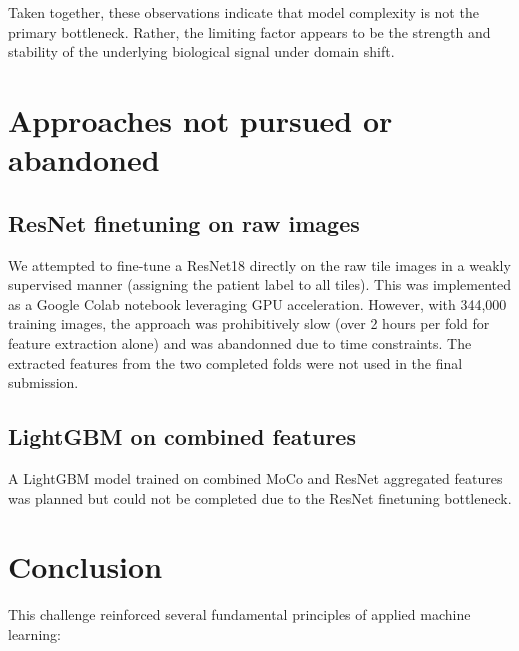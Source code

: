 \documentclass[11pt,a4paper]{article}
\begin{document}
Taken together, these observations indicate that model complexity is not the primary bottleneck. 
Rather, the limiting factor appears to be the strength and stability of the underlying biological signal under domain shift.

\newpage
\section{Approaches not pursued or abandoned}
\label{sec:abandoned}

\subsection{ResNet finetuning on raw images}
We attempted to fine-tune a ResNet18 directly on the raw tile images in a weakly supervised manner (assigning the patient label to all tiles). This was implemented as a Google Colab notebook leveraging GPU acceleration. However, with 344,000 training images, the approach was prohibitively slow (over 2 hours per fold for feature extraction alone) and was abandonned due to time constraints. The extracted features from the two completed folds were not used in the final submission.

\subsection{LightGBM on combined features}
A LightGBM model trained on combined MoCo and ResNet aggregated features was planned but could not be completed due to the ResNet finetuning bottleneck.

\newpage
\section{Conclusion}
\label{sec:conclusion}

This challenge reinforced several fundamental principles of applied machine learning:
\end{document}
